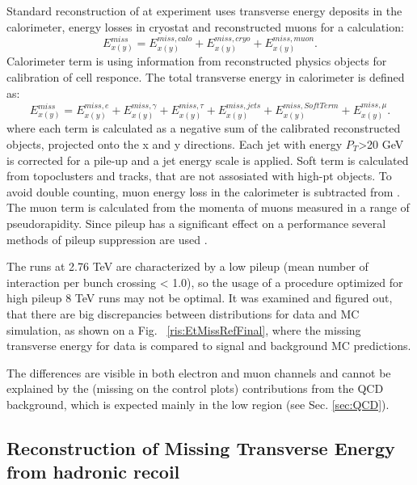 Standard reconstruction of \etmiss at \atlas experiment \cite{Aad2012} uses transverse energy deposits in the calorimeter, energy losses in cryostat and reconstructed muons for a calculation:
\begin{equation}
E_{x(y)}^{miss} = E_{x(y)}^{miss, calo} +  E_{x(y)}^{miss, cryo} +  E_{x(y)}^{miss, muon}.
\end{equation}
Calorimeter term is using information from reconstructed physics objects for calibration of cell responce. The total transverse energy in calorimeter is defined as:
\begin{equation}
E_{x(y)}^{miss} = E_{x(y)}^{miss, e} + E_{x(y)}^{miss, \gamma} + E_{x(y)}^{miss, \tau} + E_{x(y)}^{miss, jets} + E_{x(y)}^{miss,SoftTerm} + E_{x(y)}^{miss, \mu}.
\end{equation}
where each term is calculated as a negative sum of the calibrated reconstructed objects, projected onto the x and y directions. Each jet with energy $P_T$>20 GeV is corrected for a pile-up and a jet energy scale is applied. Soft term is calculated from topoclusters and tracks, that are not assosiated with high-pt objects. To avoid double counting, muon energy loss  in the calorimeter is  subtracted from \etmiss.  The \etmiss muon term is calculated from the momenta of muons measured in a range of pseudorapidity. Since pileup has a significant effect on a \etmiss performance several methods of pileup suppression are used \cite{ATLAS-CONF-2014-019}.

The runs at 2.76 TeV are characterized by a low pileup (mean number of interaction per bunch crossing < 1.0), so the usage of a procedure optimized for high pileup 8 TeV runs may not be optimal. It was examined and figured out, that there are big discrepancies between \etmiss distributions for data and MC simulation, as shown on a Fig. ~\ref{ris:EtMissRefFinal}, where the missing transverse energy for data is compared to signal and background MC predictions. 

The differences are visible in both electron and muon channels and cannot be explained by the (missing on the control plots) contributions from the QCD background, which is expected mainly in the low \etmiss region (see Sec. \ref{sec:QCD}). 



\subsection{Reconstruction of Missing Transverse Energy from hadronic recoil}


